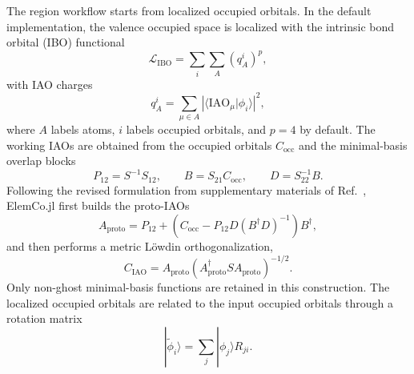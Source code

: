 \documentclass[a4paper,12pt,oneside]{book}
\newcommand{\elemcoil}{\textsf{ElemCo.jl}}
\begin{document}
The region workflow starts from localized occupied orbitals. In the default implementation, the valence occupied space is localized with the intrinsic bond orbital (IBO) functional
\begin{equation}
  \mathcal{L}_{\mathrm{IBO}} = \sum_i \sum_A \left(q_A^i\right)^p,
\end{equation}
with IAO charges
\begin{equation}
  q_A^i = \sum_{\mu \in A} \left|\langle \mathrm{IAO}_\mu | \phi_i \rangle\right|^2,
\end{equation}
where $A$ labels atoms, $i$ labels occupied orbitals, and $p=4$ by default.
The working IAOs are obtained from the occupied orbitals $C_{\mathrm{occ}}$ and the minimal-basis overlap blocks
\begin{equation}
  P_{12} = S^{-1} S_{12},
  \qquad
  B = S_{21} C_{\mathrm{occ}},
  \qquad
  D = S_{22}^{-1} B.
\end{equation}
Following the revised formulation from supplementary materials of Ref.~\cite{senjeanGeneralizationIntrinsic2021}, 
\elemcoil{} first builds the proto-IAOs
\begin{equation}
  A_{\mathrm{proto}} = P_{12} + \left(C_{\mathrm{occ}} - P_{12} D \left(B^\dagger D\right)^{-1}\right) B^\dagger,
\end{equation}
and then performs a metric L\"owdin orthogonalization,
\begin{equation}
  C_{\mathrm{IAO}} = A_{\mathrm{proto}}\left(A_{\mathrm{proto}}^\dagger S A_{\mathrm{proto}}\right)^{-1/2}.
\end{equation}
Only non-ghost minimal-basis functions are retained in this construction.
The localized occupied orbitals are related to the input occupied orbitals through a rotation matrix
\begin{equation}
  |\tilde \phi_i\rangle = \sum_j |\phi_j\rangle R_{ji}.
\end{equation}
\end{document}
